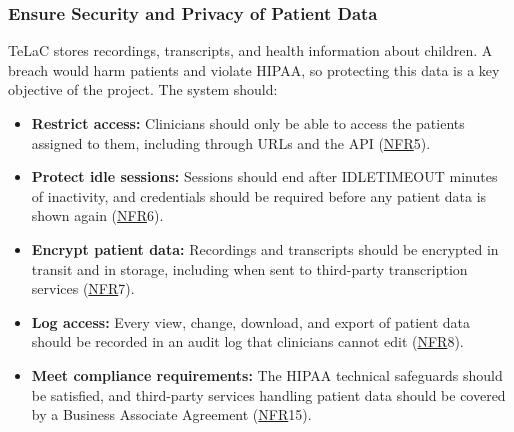 \documentclass[12pt, titlepage]{article}
\newcommand{\srsnfr}[1]{\href{https://github.com/Nour-Fawaz/MacaBoca/blob/main/pdfs/SRS/SRS.pdf}{NFR}}
\renewcommand{\_}{\oldunderscore\allowbreak}
\begin{document}
\subsubsection{Ensure Security and Privacy of Patient Data}
TeLaC stores recordings, transcripts, and health information about children. A breach would harm patients and violate HIPAA, so protecting this data is a key objective of the project. The system should:
\begin{itemize}
  \item \textbf{Restrict access:} Clinicians should only be able to access the patients assigned to them, including through URLs and the API (\srsnfr*{5}).
  \item \textbf{Protect idle sessions:} Sessions should end after IDLE\_TIMEOUT minutes of inactivity, and credentials should be required before any patient data is shown again (\srsnfr*{6}).
  \item \textbf{Encrypt patient data:} Recordings and transcripts should be encrypted in transit and in storage, including when sent to third-party transcription services (\srsnfr*{7}).
  \item \textbf{Log access:} Every view, change, download, and export of patient data should be recorded in an audit log that clinicians cannot edit (\srsnfr*{8}).
  \item \textbf{Meet compliance requirements:} The HIPAA technical safeguards should be satisfied, and third-party services handling patient data should be covered by a Business Associate Agreement (\srsnfr*{15}).
\end{itemize}
\end{document}
